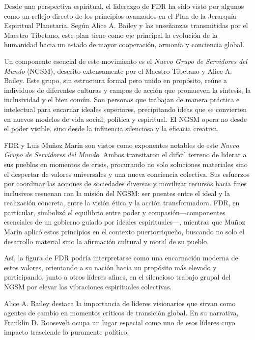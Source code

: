 \documentclass[
]{book}
\begin{document}
Desde una perspectiva espiritual, el liderazgo de FDR ha sido visto por algunos como un reflejo directo de los principios avanzados en el Plan de la Jerarquía Espiritual Planetaria. Según Alice A. Bailey y las enseñanzas transmitidas por el Maestro Tibetano, este plan tiene como eje principal la evolución de la humanidad hacia un estado de mayor cooperación, armonía y conciencia global.

Un componente esencial de este movimiento es el \emph{Nuevo Grupo de Servidores del Mundo} (NGSM), descrito extensamente por el Maestro Tibetano y Alice A. Bailey. Este grupo, sin estructura formal pero unido en propósito, reúne a individuos de diferentes culturas y campos de acción que promueven la síntesis, la inclusividad y el bien común. Son personas que trabajan de manera práctica e intelectual para encarnar ideales superiores, precipitando ideas que se convierten en nuevos modelos de vida social, política y espiritual. El NGSM opera no desde el poder visible, sino desde la influencia silenciosa y la eficacia creativa.

FDR y Luis Muñoz Marín son vistos como exponentes notables de este \emph{Nuevo Grupo de Servidores del Mundo}. Ambos transitaron el difícil terreno de liderar a sus pueblos en momentos de crisis, procurando no solo soluciones materiales sino el despertar de valores universales y una nueva conciencia colectiva. Sus esfuerzos por coordinar las acciones de sociedades diversas y movilizar recursos hacia fines inclusivos resuenan con la misión del NGSM: ser puentes entre el ideal y la realización concreta, entre la visión ética y la acción transformadora. FDR, en particular, simbolizó el equilibrio entre poder y compasión---componentes esenciales de un gobierno guiado por ideales espirituales---, mientras que Muñoz Marín aplicó estos principios en el contexto puertorriqueño, buscando no solo el desarrollo material sino la afirmación cultural y moral de su pueblo.

Así, la figura de FDR podría interpretarse como una encarnación moderna de estos valores, orientando a su nación hacia un propósito más elevado y participando, junto a otros líderes afines, en el silencioso trabajo grupal del NGSM por elevar las vibraciones espirituales colectivas.

Alice A. Bailey destaca la importancia de líderes visionarios que sirvan como agentes de cambio en momentos críticos de transición global. En su narrativa, Franklin D. Roosevelt ocupa un lugar especial como uno de esos líderes cuyo impacto trasciende lo puramente político.
\end{document}
